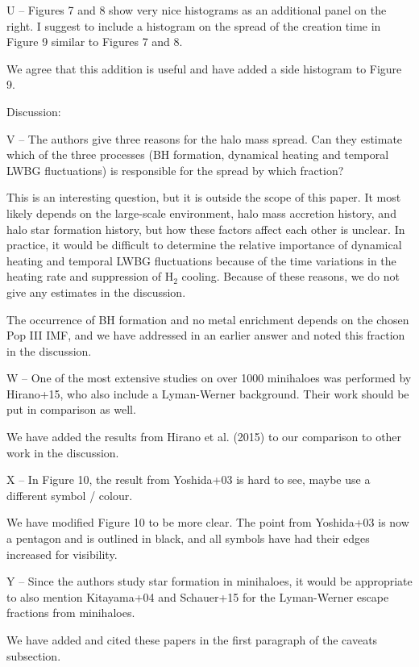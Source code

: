 \documentclass[11pt]{article}
\newenvironment{referee}[1][]{%
    \ignorespaces%
    \begin{mdframed}[style=myquotestyle,#1]%
}{%
    \end{mdframed}%
    \ignorespacesafterend%
}%
\begin{document}
\begin{referee}
U -- Figures 7 and 8 show very nice histograms as an additional panel on the right.  I suggest to include a histogram on the spread of the creation time in Figure 9 similar to Figures 7 and 8.
\end{referee}
We agree that this addition is useful and have added a side histogram to Figure 9. 

\begin{referee}
Discussion:

V -- The authors give three reasons for the halo mass spread. Can they estimate which of the three processes (BH formation, dynamical heating and temporal LWBG fluctuations) is responsible for the spread by which fraction?
\end{referee}
This is an interesting question, but it is outside the scope of this paper.  It most likely depends on the large-scale environment, halo mass accretion history, and halo star formation history, but how these factors affect each other is unclear.  In practice, it would be difficult to determine the relative importance of dynamical heating and temporal LWBG fluctuations because of the time variations in the heating rate and suppression of H$_2$ cooling.  Because of these reasons, we do not give any estimates in the discussion.

The occurrence of BH formation and no metal enrichment depends on the chosen Pop III IMF, and we have addressed in an earlier answer and noted this fraction in the discussion.

\begin{referee}
W -- One of the most extensive studies on over 1000 minihaloes was performed by Hirano+15, who also include a Lyman-Werner background. Their work should be put in comparison as well.
\end{referee}
We have added the results from Hirano et al. (2015) to our comparison to other work in the discussion.

\begin{referee}
X -- In Figure 10, the result from Yoshida+03 is hard to see, maybe use a different symbol / colour.
\end{referee}
We have modified Figure 10 to be more clear. The point from Yoshida+03 is now a pentagon and is outlined in black, and all symbols have had their edges increased for visibility.

\begin{referee}
Y -- Since the authors study star formation in minihaloes, it would be appropriate to also mention Kitayama+04 and Schauer+15 for the Lyman-Werner escape fractions from minihaloes.
\end{referee}
We have added and cited these papers in the first paragraph of the caveats subsection.
\end{document}
